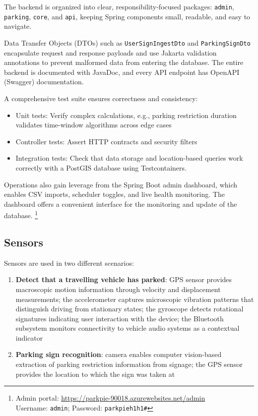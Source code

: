 The backend is organized into clear, responsibility-focused packages: \texttt{admin}, \texttt{parking}, \texttt{core}, and \texttt{api}, keeping Spring components small, readable, and easy to navigate.

Data Transfer Objects (DTOs) such as \texttt{UserSignIngestDto} and \texttt{ParkingSignDto} encapsulate request and response payloads and use Jakarta validation annotations to prevent malformed data from entering the database. The entire backend is documented with JavaDoc, and every API endpoint has OpenAPI (Swagger) documentation.

A comprehensive test suite ensures correctness and consistency:
\begin{itemize}
    \item Unit tests: Verify complex calculations, e.g., parking restriction duration validates time-window algorithms across edge cases
    \item Controller tests: Assert HTTP contracts and security filters
    \item Integration tests: Check that data storage and location-based queries work correctly with a PostGIS database using Testcontainers.
\end{itemize}

Operations also gain leverage from the Spring Boot admin dashboard, which enables CSV imports, scheduler toggles, and live health monitoring. The dashboard offers a convenient interface for the monitoring and update of the database. \footnote{Admin portal: \url{https://parkpie-90018.azurewebsites.net/admin}\\ Username: \texttt{admin}; Password: \texttt{parkpieh1h1\#}}

\subsection{Sensors}
\label{subsec:sensors}

Sensors are used in two different scenarios:

\begin{enumerate}
    \item \textbf{Detect that a travelling vehicle has parked}: GPS sensor provides macroscopic motion information through velocity and displacement measurements; the accelerometer captures microscopic vibration patterns that distinguish driving from stationary states; the gyroscope detects rotational signatures indicating user interaction with the device; the Bluetooth subsystem monitors connectivity to vehicle audio systems as a contextual indicator
    \item \textbf{Parking sign recognition}: camera enables computer vision-based extraction of parking restriction information from signage; the GPS sensor provides the location to which the sign was taken at
\end{enumerate}

